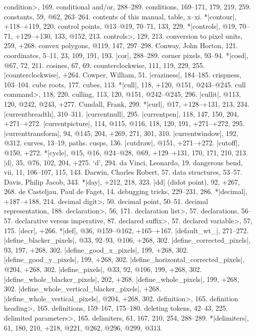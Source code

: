 \<condition>, 169.
conditional and/or, 288--289.
conditions, 169--171, 179, 219, 259.
constants, 59, @62, 263--264.
contents of this manual, table, x--xi.
*|contour|, +118--+119, 220.
control points, @13--@19, 70--71, 133, 229.
*|controls|, @19, 70--71, +129--+130, 133, @152, 213.
\<controls>, 129, 213.
conversion to pixel units, 259, +268.
convex polygons, @119, 147, 297--298.
Conway, John Horton, 121.
coordinates, 5--11, 23, 109, 191, 193.
|cor|, 288--289.
corner pixels, 93--94.
*|cosd|, @67, 72, 211.
cosines, 67, 69.
counterclockwise, 111, 119, 229, 255.
|counterclockwise|, +264.
Cowper, William, 51.
|craziness|, 184--185.
crispness, 103--104.
cube roots, 177.
cubes, 113.
*|cull|, 118, +120, @151, @243--@245.
\<cull command>, 118, 220.
culling, 113, 120, @151, @242--@245, 296.
|cullit|, @113, 120, @242, @243, +277.
Cundall, Frank, 299.
*|curl|, @17, +128--+131, 213, 234.
|currentbreadth|, 310--311.
|currentnull|, 295.
|currentpen|, 118, 147, 150, 204, +271--+272.
|currentpicture|, 114, @115, @116, 118, 120, 191, +271--+272, 295.
|currenttransform|, 94, @145, 204, +269, 271, 301, 310.
|currentwindow|, 192, @312.
curves, 13--19, \see paths.
cusps, 136.
|cutdraw|, @151, +271--+272.
|cutoff|, @150, +272.
*|cycle|, @15, @16, @24--@28, @69, +129--+131, 170, 171, 210, 213.
\newletter
|d|, 35, @76, 102, 204, +275.
`d', 294.
da Vinci, Leonardo, 19.
dangerous bend, vii, 11, 106--107, 115, 143.
Darwin, Charles Robert, 57.
data structures, 53--57.
Davis, Philip Jacob, 343.
*|day|, +212, 218, 323.
|dd| (didot point), 92, +267, 268.
de Casteljau, Paul de Faget, 14.
debugging tricks, 229--231, 286.
*|decimal|, +187--+188, 214.
\<decimal digit>, 50.
decimal point, 50--51.
decimal representation, 188.
\<declaration>, 56, 171.
\<declaration list>, 57.
declarations, 56--57.
declarative versus imperative, 87.
\<declared suffix>, 57.
\<declared variable>, 57, 175.
|decr|, +266.
*|def|, @36, @159--@162, +165--+167.
|default_wt_|, 271--272.
|define_blacker_pixels|, @33, 92--93, @106, +268, 302.
|define_corrected_pixels|, 93, 197, +268, 302.
|define_good_x_pixels|, 199, +268, 302.
|define_good_y_pixels|, 199, +268, 302.
|define_horizontal_corrected_pixels|, @204, +268, 302.
|define_pixels|, @33, 92, @106, 199, +268, 302.
|define_whole_blacker_pixels|, 202, +268.
|define_whole_pixels|, 199, +268, 302.
|define_whole_vertical_blacker_pixels|, +268.
|define_whole_vertical_pixels|, @204, +268, 302.
\<definition>, 165.
\<definition heading>, 165.
definitions, 159--167, 175--180.
deleting tokens, 42--43, 225.
\<delimited parameters>, 165.
delimiters, 61, 167, 210, 254, 288--289.
*|delimiters|, 61, 180, 210, +218, @221, @262, @296, @299, @313.
